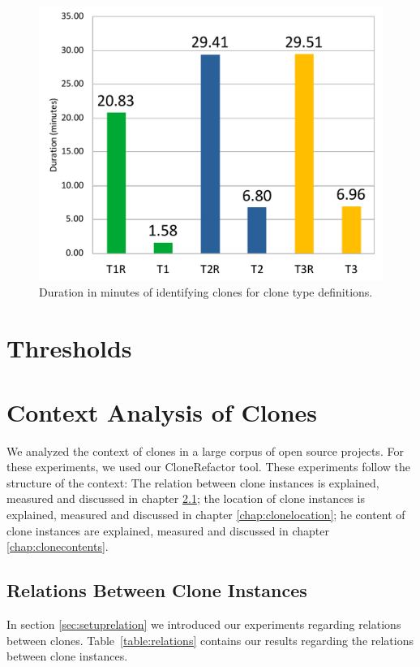 \begin{figure}[H]
  \centering
    \includegraphics[width=.5\columnwidth]{img/DurationChart}
    \caption{Duration in minutes of identifying clones for clone type definitions.}
  \label{fig:performance}
\end{figure}

\section{Thresholds} \label{sec:thresholds}

\section{Context Analysis of Clones}\label{chap:clonecontextexpl}
We analyzed the context of clones in a large corpus of open source projects. For these experiments, we used our CloneRefactor tool. These experiments follow the structure of the context: The relation between clone instances is explained, measured and discussed in chapter \ref{chap:relationsinstances}; the location of clone instances is explained, measured and discussed in chapter \ref{chap:clonelocation};  he content of clone instances are explained, measured and discussed in chapter \ref{chap:clonecontents}.

\subsection{Relations Between Clone Instances} \label{chap:relationsinstances}
In section \ref{sec:setuprelation} we introduced our experiments regarding relations between clones. Table~\ref{table:relations} contains our results regarding the relations between clone instances.

